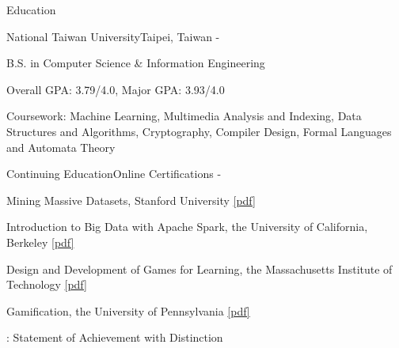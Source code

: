 \documentclass{cv}
\begin{document}
\begin{cvHeader} 
\end{cvHeader}


\begin{cvSection}{Education}

\begin{eduSubsection}{National Taiwan University}{Taipei, Taiwan}{ - }

\item B.S. in Computer Science \& Information Engineering
\item Overall GPA: 3.79/4.0, Major GPA: 3.93/4.0
\item Coursework: Machine Learning, Multimedia Analysis and Indexing, Data Structures and Algorithms, Cryptography, Compiler Design, Formal Languages and Automata Theory
\end{eduSubsection}

\begin{eduSubsection}{Continuing Education}{Online Certifications}{ - }
\item *Mining Massive Datasets, Stanford University \href{https://drive.google.com/uc?export=download&id=0B8Evfo4JjbBSTDFIa212ckQ4UUU}{[pdf]} %
\item Introduction to Big Data with Apache Spark, the University of California, Berkeley \href{https://s3.amazonaws.com/verify.edx.org/downloads/8e52b92f46154cddbecd6b089df1083e/Certificate.pdf}{[pdf]} %
\item Design and Development of Games for Learning, the Massachusetts Institute of Technology \href{https://s3.amazonaws.com/verify.edx.org/downloads/65152ce5fadb4f5d8b16add38babedaf/Certificate.pdf}{[pdf]} %
\item Gamification, the University of Pennsylvania \href{https://drive.google.com/uc?export=download&id=0B8Evfo4JjbBSZjFIdl9XMWFnVXM}{[pdf]} %

\hfill {\footnotesize *: Statement of Achievement with Distinction}

\end{eduSubsection}

\end{cvSection}
\end{document}
